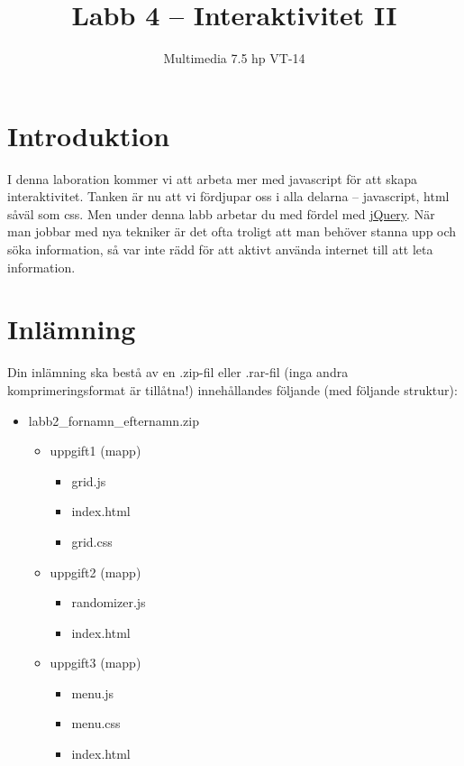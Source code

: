 \documentclass[12pt]{article}
\date{}
\title{ Labb 4 -- Interaktivitet II }
\author{ Multimedia 7.5 hp VT-14 }
\begin{document}
\maketitle
\vspace{-2em}



\section{Introduktion}
I denna laboration kommer vi att arbeta mer med javascript för att skapa interaktivitet. Tanken är nu att vi fördjupar oss i alla delarna -- javascript, html såväl som css. Men under denna labb arbetar du med fördel med \href{http://jquery.com/}{jQuery}. När man jobbar med nya tekniker är det ofta troligt att man behöver stanna upp och söka information, så var inte rädd för att aktivt använda internet till att leta information.

\section{Inlämning}
Din inlämning ska bestå av en .zip-fil eller .rar-fil (inga andra komprimeringsformat är tillåtna!) innehållandes följande (med följande struktur):
  \begin{itemize}
    \item labb2\_fornamn\_efternamn.zip

      \begin{itemize}
        \item uppgift1 (mapp)
          \begin{itemize}
            \item grid.js 
            \item index.html
	    \item grid.css
          \end{itemize}
        \item uppgift2 (mapp)
          \begin{itemize}
            \item randomizer.js
            \item index.html
          \end{itemize}
	      \item uppgift3 (mapp)
          \begin{itemize}
            \item menu.js
            \item menu.css
            \item index.html
          \end{itemize}
    \end{itemize}
  \end{itemize}
\end{document}
